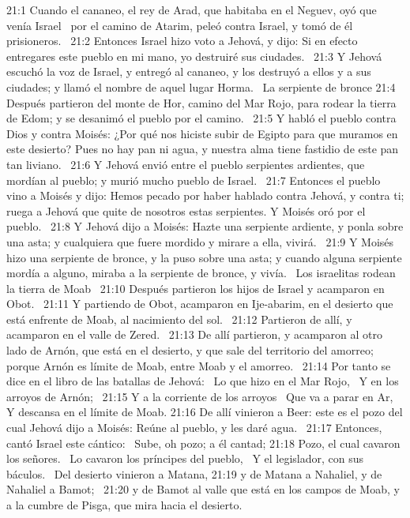 21:1 Cuando el cananeo, el rey de Arad, que habitaba en el Neguev, oyó que venía Israel  por el camino de Atarim, peleó contra Israel, y tomó de él prisioneros.  
21:2 Entonces Israel hizo voto a Jehová, y dijo: Si en efecto entregares este pueblo en mi mano, yo destruiré sus ciudades.  
21:3 Y Jehová escuchó la voz de Israel, y entregó al cananeo, y los destruyó a ellos y a sus ciudades; y llamó el nombre de aquel lugar Horma.  
La serpiente de bronce 
21:4 Después partieron del monte de Hor, camino del Mar Rojo, para rodear la tierra de Edom; y se desanimó el pueblo por el camino.  
21:5 Y habló el pueblo contra Dios y contra Moisés: ¿Por qué nos hiciste subir de Egipto para que muramos en este desierto? Pues no hay pan ni agua, y nuestra alma tiene fastidio de este pan tan liviano.  
21:6 Y Jehová envió entre el pueblo serpientes ardientes, que mordían al pueblo; y murió mucho pueblo de Israel.  
21:7 Entonces el pueblo vino a Moisés y dijo: Hemos pecado por haber hablado contra Jehová, y contra ti; ruega a Jehová que quite de nosotros estas serpientes. Y Moisés oró por el pueblo.  
21:8 Y Jehová dijo a Moisés: Hazte una serpiente ardiente, y ponla sobre una asta; y cualquiera que fuere mordido y mirare a ella, vivirá.  
21:9 Y Moisés hizo una serpiente de bronce, y la puso sobre una asta; y cuando alguna serpiente mordía a alguno, miraba a la serpiente de bronce, y vivía.  
Los israelitas rodean la tierra de Moab  
21:10 Después partieron los hijos de Israel y acamparon en Obot.  
21:11 Y partiendo de Obot, acamparon en Ije-abarim, en el desierto que está enfrente de Moab, al nacimiento del sol.  
21:12 Partieron de allí, y acamparon en el valle de Zered.  
21:13 De allí partieron, y acamparon al otro lado de Arnón, que está en el desierto, y que sale del territorio del amorreo; porque Arnón es límite de Moab, entre Moab y el amorreo.  
21:14 Por tanto se dice en el libro de las batallas de Jehová:  
Lo que hizo en el Mar Rojo,  
Y en los arroyos de Arnón;  
21:15 Y a la corriente de los arroyos  
Que va a parar en Ar,  
Y descansa en el límite de Moab. 
21:16 De allí vinieron a Beer: este es el pozo del cual Jehová dijo a Moisés: Reúne al pueblo, y les daré agua.  
21:17 Entonces, cantó Israel este cántico:  
Sube, oh pozo; a él cantad; 
21:18 Pozo, el cual cavaron los señores.  
Lo cavaron los príncipes del pueblo,  
Y el legislador, con sus báculos.  
Del desierto vinieron a Matana, 
21:19 y de Matana a Nahaliel, y de Nahaliel a Bamot;  
21:20 y de Bamot al valle que está en los campos de Moab, y a la cumbre de Pisga, que mira hacia el desierto.  
